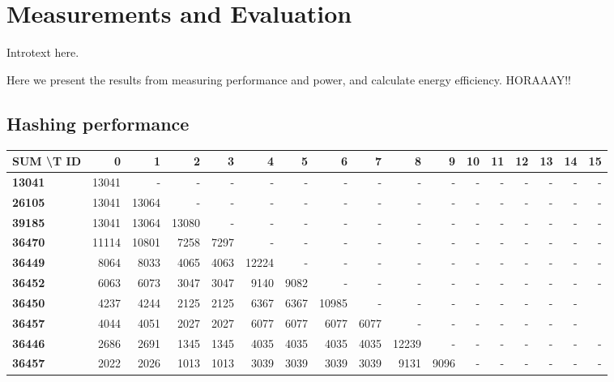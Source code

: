 \chapter{Measurements and Evaluation}
\label{cha:evaluation}

Introtext here.

Here we present the results from measuring performance and power, and calculate energy efficiency.
HORAAAY!!

\section{Hashing performance}

\begin{table}
\tiny
\begin{tabular}{| l || r | r | r | r | r | r | r | r | r | r | r | r | r | r | r | r |}
  \hline 
  \textbf{SUM \textbackslash T ID} & \textbf{0} & \textbf{1} & \textbf{2} & \textbf{3} & \textbf{4} & \textbf{5} & \textbf{6} & \textbf{7} & \textbf{8} & \textbf{9} & \textbf{10} & \textbf{11} & \textbf{12} & \textbf{13} & \textbf{14} & \textbf{15}   \\
  \hline                       
  \textbf{13041} & 13041 & - & - & - & - & - & - & - & - & - & - & - & - & - & - & - \\
  \textbf{26105} & 13041 & 13064 & - & - & - & - & - & - & - & - & - & - & - & - & - & - \\
  \textbf{39185} & 13041 & 13064 & 13080 & - & - & - & - & - & - & - & - & - & - & - & - & - \\
  \textbf{36470} & 11114	& 10801 & 7258 & 7297 & - & - & - & - & - & - & - & - & - & - & - & - \\
  \textbf{36449} & 8064 & 8033 & 4065 & 4063 & 12224 & - & - & - & - & - & - & - & - & - & - & - \\
  \textbf{36452} & 6063 & 6073 & 3047 & 3047 & 9140 & 9082 & - & - & - & - & - & - & - & - & - & - \\
  \textbf{36450} & 4237 & 4244 & 2125 & 2125 & 6367 & 6367 & 10985 & - & - & - & - & - & - & - & -\\
  \textbf{36457} & 4044 & 4051 & 2027 & 2027 & 6077 & 6077 & 6077 & 6077 & - & - & - & - & - & - & - \\
  \textbf{36446} & 2686 & 2691 & 1345 & 1345 & 4035 & 4035 & 4035 & 4035 & 12239 & - & - & - & - & - & - & -\\
  \textbf{36457} & 2022 & 2026 & 1013 & 1013 & 3039 & 3039 & 3039 & 3039 & 9131 & 9096 & - & - & - & - & - & -\\

\end{tabular}
\end{table}
